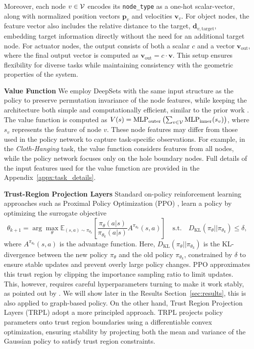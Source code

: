 Moreover, each node $v \in {\mathcal{V}}$ encodes its \texttt{node\_type} as a one-hot scalar-vector, along with normalized position vectors $\mathbf{p}_v$ and velocities $\mathbf{v}_v$. For object nodes, the feature vector also includes the relative distance to the target, $\mathbf{d}_{v, \text{target}}$, embedding target information directly without the need for an additional target node. For actuator nodes, the output consists of both a scalar $c$ and a vector $\mathbf{v}_\text{out}$, where the final output vector is computed as $\mathbf{v}_\text{out} = c \cdot \mathbf{v}$. This setup ensures flexibility for diverse tasks while maintaining consistency with the geometric properties of the system.

\textbf{Value Function} We employ DeepSets \citep{deepsets} with the same input structure as the policy to preserve permutation invariance of the node features, while keeping the architecture both simple and computationally efficient, similar to the prior work \cite{simm2021symmetryaware}. The value function is computed as $V(s) = \text{MLP}_{\text{outer}} \left( \sum_{v \in {\mathcal{V}}} \text{MLP}_{\text{inner}} (s_v) \right)$,
where $s_v$ represents the feature of node $v$. These node features may differ from those used in the policy network to capture task-specific observations. For example, in the \textit{Cloth-Hanging} task, the value function considers features from all nodes, while the policy network focuses only on the hole boundary nodes. Full details of the input features used for the value function are provided in the Appendix~\ref{appx:task_details}. 

\textbf{Trust-Region Projection Layers} Standard on-policy reinforcement learning approaches such as Proximal Policy Optimization (PPO) \citep{ppo}, learn a policy by optimizing the surrogate objective
$$
\theta_{k+1} = \arg \max_\theta \mathbb{E}_{(s,a) \sim \pi_{\theta_k}} \left[ \frac{\pi_\theta(a|s)}{\pi_{\theta_k}(a|s)} A^{\pi_{\theta_k}}(s,a) \right] \quad \text{s.t.} \quad D_{\text{KL}}(\pi_\theta || \pi_{\theta_k}) \leq \delta,
$$
where $A^{\pi_{\theta_k}}(s,a)$ is the advantage function. Here, $D_{\text{KL}}(\pi_\theta || \pi_{\theta_k})$ is the KL-divergence between the new policy $\pi_\theta$ and the old policy $\pi_{\theta_k}$, constrained by $\delta$ to ensure stable updates and prevent overly large policy changes. 
PPO approximates this trust region by clipping the importance sampling ratio to limit updates. This, however, requires careful hyperparameters turning to make it work stably, as pointed out by \cite{andrychowicz2021what}. We will show later in the Results Section~\ref{sec:results}, this is also applied to graph-based policy. On the other hand, Trust Region Projection Layers (TRPL) \citep{otto2021trpl} adopt a more principled approach. TRPL projects policy parameters onto trust region boundaries using a differentiable convex optimization, ensuring stability by projecting both the mean and variance of the Gaussian policy to satisfy trust region constraints. 


